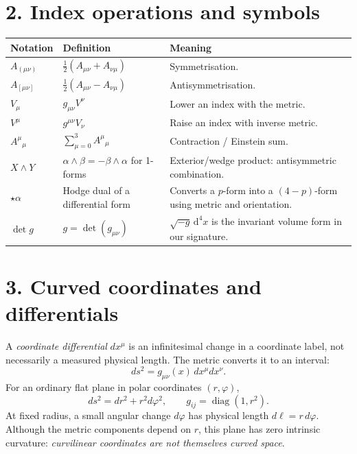 \documentclass[10pt,a4paper]{article}
\begin{document}
\section*{2. Index operations and symbols}
\begin{tabular}{@{}p{.18\linewidth}p{.34\linewidth}p{.43\linewidth}@{}}
\toprule
\textbf{Notation} & \textbf{Definition} & \textbf{Meaning}\\\midrule
$A_{(\mu\nu)}$ & $\tfrac12(A_{\mu\nu}+A_{\nu\mu})$ & Symmetrisation.\\
$A_{[\mu\nu]}$ & $\tfrac12(A_{\mu\nu}-A_{\nu\mu})$ & Antisymmetrisation.\\
$V_\mu$ & $g_{\mu\nu}V^\nu$ & Lower an index with the metric.\\
$V^\mu$ & $g^{\mu\nu}V_\nu$ & Raise an index with inverse metric.\\
$A^\mu{}_\mu$ & $\sum_{\mu=0}^{3} A^\mu{}_\mu$ & Contraction / Einstein sum.\\
$X\wedge Y$ & $\alpha\wedge\beta=-\beta\wedge\alpha$ for 1-forms & Exterior/wedge product: antisymmetric combination.\\
$\star\alpha$ & Hodge dual of a differential form & Converts a $p$-form into a $(4-p)$-form using metric and orientation.\\
$\det g$ & $g=\det(g_{\mu\nu})$ & $\sqrt{-g}\,\mathrm d^4x$ is the invariant volume form in our signature.\\\bottomrule
\end{tabular}

\section*{3. Curved coordinates and differentials}
A \emph{coordinate differential} $dx^\mu$ is an infinitesimal change in a coordinate label, not necessarily a measured physical length. The metric converts it to an interval:
\begin{equation}
ds^2=g_{\mu\nu}(x)\,dx^\mu dx^\nu.
\end{equation}
For an ordinary flat plane in polar coordinates $(r,\varphi)$,
\begin{equation}
ds^2=dr^2+r^2d\varphi^2,
\qquad g_{ij}=\operatorname{diag}(1,r^2).
\end{equation}
At fixed radius, a small angular change $d\varphi$ has physical length $d\ell=r\,d\varphi$. Although the metric components depend on $r$, this plane has zero intrinsic curvature: \emph{curvilinear coordinates are not themselves curved space}.
\end{document}
